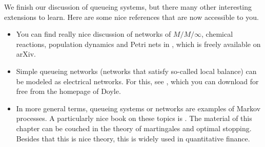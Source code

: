 We finish our discussion of queueing systems, but there many other interesting extensions to learn. Here are some nice  references that are now accessible to you. 
\begin{itemize}
\item You can find  really nice discussion of networks of $M/M/\infty$, chemical reactions, population dynamics and Petri nets in \cite{baez2012quantum}, which is freely available on arXiv.
\item Simple queueing networks (networks that satisfy so-called local balance) can be modeled as electrical networks.
  For this, see \cite{doyle84:_random_walks_elect_networ}, which you can download for free from the homepage of Doyle.
\item In more general terms, queueing systems or networks are examples of Markov processes.
  A particularly nice book on these topics is \cite{norris97:_markov_chain}.
  The material of this chapter can be couched in the theory of martingales and optimal stopping.
  Besides that this is nice theory, this is widely used in quantitative finance.
\end{itemize}






